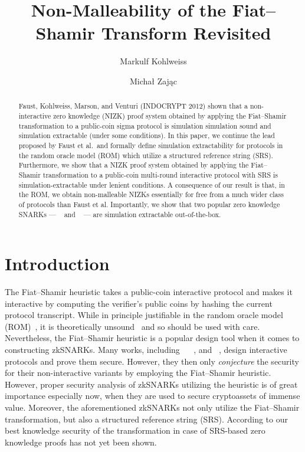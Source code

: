 \documentclass[runningheads,11pt]{llncs}
\title{Non-Malleability of the Fiat--Shamir Transform Revisited}
\author{Markulf Kohlweiss\inst{1,2} \and Michał Zając\inst{3}}
\institute{University of Edinburgh, Edinburgh, UK \and IOHK \\
\email{mkohlwei@inf.ed.ac.uk} \and Clearmatics, London, UK \\
\email{m.p.zajac@gmail.com}}
\begin{document}
 \sloppy \maketitle

\begin{abstract}
  Faust, Kohlweiss, Marson, and Venturi (INDOCRYPT 2012) shown that a
  non-interactive zero knowledge (NIZK) proof system obtained by applying the
  Fiat--Shamir transformation to a public-coin sigma protocol is simulation
  simulation sound and simulation extractable (under some conditions). In this
  paper, we continue the lead proposed by Faust et al.~and formally define
  simulation extractability for protocols in the random oracle model (ROM) which
  utilize a structured reference string (SRS). Furthermore, we show that a NIZK
  proof system obtained by applying the Fiat--Shamir transformation to a
  public-coin multi-round interactive protocol with SRS is
  simulation-extractable under lenient conditions. A consequence of our result
  is that, in the ROM, we obtain non-malleable NIZKs essentially for free from a
  much wider class of protocols than Faust et al. Importantly, we show that two
  popular zero knowledge SNARKs --- \plonk{}~\cite{EPRINT:GabWilCio19} and
  \sonic{}~\cite{CCS:MBKM19} --- are simulation extractable out-of-the-box.
\end{abstract}

\section{Introduction}
The Fiat--Shamir heuristic takes a public-coin interactive protocol and makes it
interactive by computing the verifier's public coins by hashing the current
protocol transcript. While in principle justifiable in the random oracle model
(ROM)~\cite{CCS:BelRog93}, it is theoretically unsound~\cite{FOCS:GolKal03} and
so should be used with care.  Nevertheless, the Fiat--Shamir heuristic is a
popular design tool when it comes to constructing zkSNARKs. Many works,
including \sonic{}~\cite{CCS:MBKM19} \plonk{}~\cite{EPRINT:GabWilCio19}, and
\marlin~\cite{EC:CHMMVW20}, design interactive protocols and prove them
secure. However, they then only \emph{conjecture} the security for their
non-interactive variants by employing the Fiat--Shamir heuristic.
However, proper security analysis of zkSNARKs utilizing the heuristic is of
great importance especially now, when they are used to secure cryptoassets of
immense value. Moreover, the aforementioned zkSNARKs not only utilize the
Fiat--Shamir transformation, but also a structured reference string
(SRS). According to our best knowledge security of the transformation in case of
SRS-based zero knowledge proofs has not yet been shown.
\end{document}

